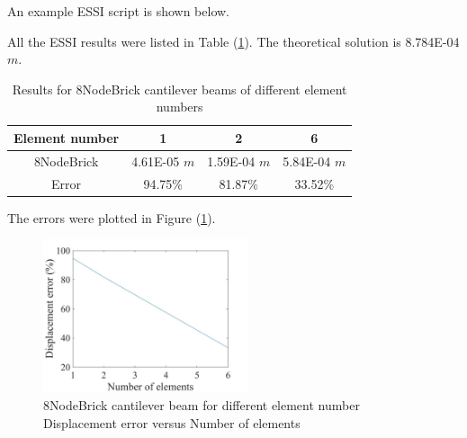 \documentclass[fleqn,11pt]{article}
\begin{document}
An example ESSI script is shown below.




All the ESSI results were listed in Table (\ref{table 8NodeBrick cantilever beams results for different element number}). 
The theoretical solution is 8.784E-04 $m$.
\begin{table}[H]
  \centering
    \caption{Results for 8NodeBrick cantilever beams of different element numbers}
    \begin{tabular}{|c|c|c|c|}
      \hline
      Element number & 1        & 2        & 6         \\  \hline
      8NodeBrick     & 4.61E-05 $m$ & 1.59E-04 $m$ & 5.84E-04 $m$     \\ \hline
      Error           & 94.75\%  & 81.87\%  & 33.52\%           \\ 
      \hline 
    \end{tabular}
    \label{table 8NodeBrick cantilever beams results for different element number}
\end{table}

The errors were plotted in Figure (\ref{fig error 8NodeBrick cantilever beam for different element number}).
\begin{figure}[H]
    \centering
    \includegraphics[width=6cm]{../Figure-files/error8brick_beam_different_element_number.jpeg}
  \captionsetup{justification=centering,margin=3cm}
  \caption{8NodeBrick cantilever beam for different element number\\
    Displacement error   versus   Number of elements}
  \label{fig error 8NodeBrick cantilever beam for different element number}
\end{figure}
\end{document}

